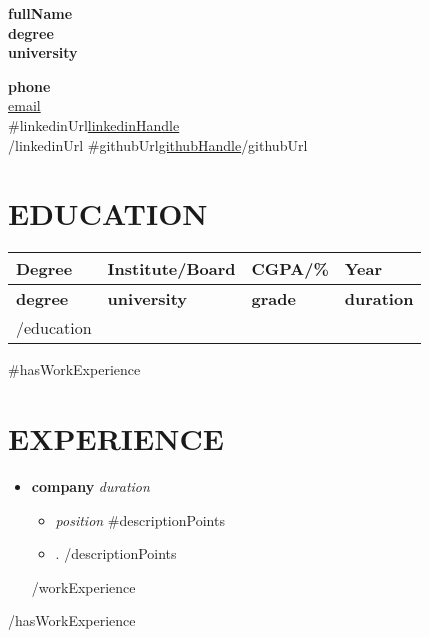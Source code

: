 \documentclass[a4paper,11pt]{article}
\newenvironment{bolditemize}
  {\begin{itemize}[noitemsep, itemsep=0.4em, leftmargin=*]
   \renewcommand{\labelitemi}{\normalfont\bfseries\textbullet}
   \setlength{\labelsep}{0.5em}}
  {\end{itemize}}
\newenvironment{subitemize}
  {\begin{itemize}[noitemsep, itemsep=0.3em, leftmargin=1.5em]
   \renewcommand{\labelitemi}{\normalfont--}
   \setlength{\labelsep}{0.5em}}
  {\end{itemize}}
\begin{document}
\noindent
\begin{minipage}[t]{0.64\textwidth}
    {\fontsize{22}{24}\selectfont\bfseries {{fullName}}} \\[0.5ex]
    {\bfseries {{degree}}} \\
    {\bfseries {{university}}}
\end{minipage}%
\begin{minipage}[t]{0.34\textwidth}\raggedleft
    \textbf{{{phone}}} \\
    \href{mailto:{{email}}}{{{email}}} \\
    {{#linkedinUrl}}\href{{{linkedinUrl}}}{{{linkedinHandle}}} \\{{/linkedinUrl}}
    {{#githubUrl}}\href{{{githubUrl}}}{{{githubHandle}}}{{/githubUrl}}
\end{minipage}

\section*{EDUCATION}
\begin{center}
\renewcommand{\arraystretch}{1.2}
\begin{tabular}{|>{\centering\arraybackslash}p{4.6cm}|>{\centering\arraybackslash}p{6.6cm}|>{\centering\arraybackslash}p{3.4cm}|>{\centering\arraybackslash}p{3.4cm}|}
\hline
\textbf{Degree} & \textbf{Institute/Board} & \textbf{CGPA/\%} & \textbf{Year} \\
\hline
{{#education}}
\textbf{{{degree}}} & \textbf{{{university}}} & \textbf{{{grade}}} & \textbf{{{duration}}} \\
\hline
{{/education}}
\end{tabular}
\end{center}

{{#hasWorkExperience}}
\section*{EXPERIENCE}
\begin{bolditemize}
{{#workExperience}}
    \item \textbf{{{company}}} \hfill \textit{{{duration}}}
    \begin{subitemize}
        \item \textit{{{position}}}
        {{#descriptionPoints}}
        \item {{.}}
        {{/descriptionPoints}}
    \end{subitemize}
{{/workExperience}}
\end{bolditemize}
{{/hasWorkExperience}}
\end{document}
